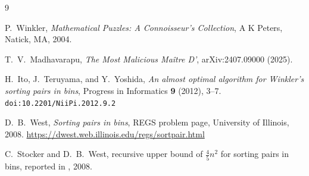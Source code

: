 \documentclass[11pt]{amsart}
\theoremstyle{plain}
\theoremstyle{definition}
\theoremstyle{remark}
\begin{document}
\begin{thebibliography}{9}

 P.~Winkler, \emph{Mathematical Puzzles: A Connoisseur's Collection}, A K Peters, Natick, MA, 2004.

 T.~V.~Madhavarapu, \emph{The Most Malicious Ma\^itre D'}, arXiv:2407.09000 (2025).

 H.~Ito, J.~Teruyama, and Y.~Yoshida, \emph{An almost optimal algorithm for Winkler's sorting pairs in bins}, Progress in Informatics \textbf{9} (2012), 3--7. \texttt{doi:10.2201/NiiPi.2012.9.2}

 D.~B.~West, \emph{Sorting pairs in bins}, REGS problem page, University of Illinois, 2008. \url{https://dwest.web.illinois.edu/regs/sortpair.html}

 C.~Stocker and D.~B.~West, recursive upper bound of $\tfrac45 n^2$ for sorting pairs in bins, reported in \cite{West}, 2008.

\end{thebibliography}
\end{document}
